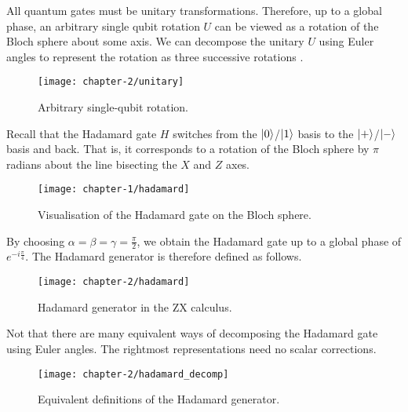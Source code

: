 All quantum gates must be unitary transformations. Therefore, up to a global phase, an arbitrary single qubit rotation $U$ can be viewed as a rotation of the Bloch sphere about some axis. We can decompose the unitary $U$ using Euler angles to represent the rotation as three successive rotations \cite{Wetering2020}.
\begin{figure}[H]
    \centering
    \texttt{[image: chapter-2/unitary]}
    \caption{Arbitrary single-qubit rotation.}
\end{figure}

Recall that the Hadamard gate $H$ switches from the $\ket 0$/$\ket 1$ basis to the $\ket +$/$\ket -$ basis and back. That is, it corresponds to a rotation of the Bloch sphere by $\pi$ radians about the line bisecting the $X$ and $Z$ axes.

\begin{figure}[H]
\centering
    \centering
    \texttt{[image: chapter-1/hadamard]}
    \caption{Visualisation of the Hadamard gate on the Bloch sphere.}
\end{figure}

By choosing $\alpha = \beta = \gamma = \frac{\pi}{2}$, we obtain the Hadamard gate up to a global phase of $e^{-i\frac{\pi}{4}}$. The Hadamard generator is therefore defined as follows.
\begin{figure}[H]
\centering
    \centering
    \texttt{[image: chapter-2/hadamard]}
    \caption{Hadamard generator in the ZX calculus.}
\end{figure}

Not that there are many equivalent ways of decomposing the Hadamard gate using Euler angles. The rightmost representations need no scalar corrections.
\begin{figure}[H]
\centering
    \centering
    \texttt{[image: chapter-2/hadamard\_decomp]}
    \caption{Equivalent definitions of the Hadamard generator.}
\end{figure}
